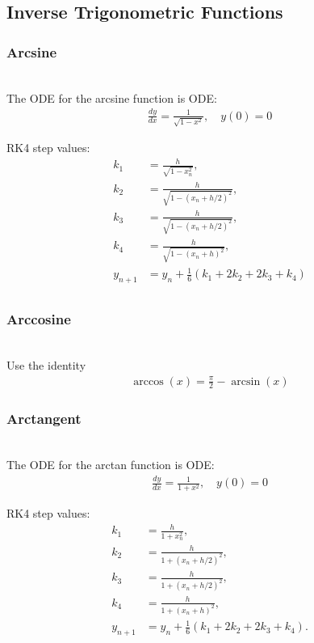 \documentclass[conference]{IEEEtran}
\begin{document}
\subsection{Inverse Trigonometric Functions}
\subsubsection{Arcsine} \\
The ODE for the arcsine function \cite{ncert12} is
ODE:
\begin{align}
\frac{dy}{dx} = \frac{1}{\sqrt{1-x^2}}, \quad y(0)=0
\end{align}

RK4 step values:
\begin{align}
k_1 &= \frac{h}{\sqrt{1-x_n^2}}, \\
k_2 &= \frac{h}{\sqrt{1-(x_n+h/2)^2}}, \\
k_3 &= \frac{h}{\sqrt{1-(x_n+h/2)^2}}, \\
k_4 &= \frac{h}{\sqrt{1-(x_n+h)^2}}, \\
y_{n+1} &= y_n+\frac{1}{6}(k_1+2k_2+2k_3+k_4)\\
\end{align}

\subsubsection{Arccosine} \\
 Use the identity \cite{ncert12}
\begin{align}
   \arccos(x) = \frac{\pi}{2} - \arcsin(x) 
\end{align}

\subsubsection{Arctangent} \\
The ODE for the arctan function \cite{ncert12} is
ODE:
\begin{align}
\frac{dy}{dx} = \frac{1}{1+x^2}, \quad y(0)=0
\end{align}

RK4 step values:
\begin{align}
k_1 &= \frac{h}{1+x_n^2}, \\
k_2 &= \frac{h}{1+(x_n+h/2)^2}, \\
k_3 &= \frac{h}{1+(x_n+h/2)^2}, \\
k_4 &= \frac{h}{1+(x_n+h)^2}, \\
y_{n+1} &= y_n+\tfrac{1}{6}(k_1+2k_2+2k_3+k_4).
\end{align}
\end{document}
